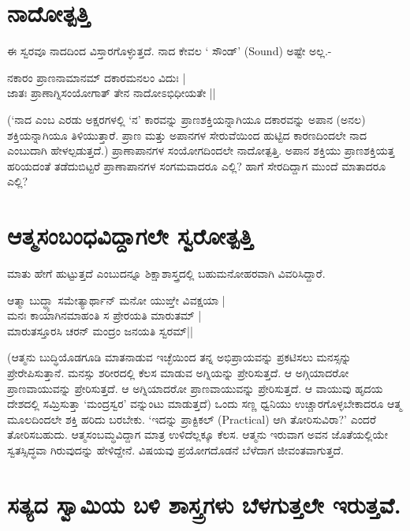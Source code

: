 \section*{ನಾದೋತ್ಪತ್ತಿ}

ಈ ಸ್ವರವೂ ನಾದದಿಂದ  ವಿಸ್ತಾರಗೊಳ್ಳುತ್ತದೆ. ನಾದ ಕೇವಲ ` ಸೌಂಡ್' {(\eng Sound)} ಅಷ್ಟೇ ಅಲ್ಲ.-

\begin{shloka}
ನಕಾರಂ ಪ್ರಾಣನಾಮಾನಮ್ ದಕಾರಮನಲಂ ವಿದುಃ |\label{17}\\
ಜಾತಃ ಪ್ರಾಣಾಗ್ನಿಸಂಯೋಗಾತ್ ತೇನ ನಾದೋಽಭಿಧೀಯತೇ ||
\end{shloka}

(`ನಾದ ಎಂಬ ಎರಡು ಅಕ್ಷರಗಳಲ್ಲಿ  `ನ' ಕಾರವನ್ನು  ಪ್ರಾಣಶಕ್ತಿಯನ್ನಾಗಿಯೂ ದಕಾರವನ್ನು ಅಪಾನ (ಅನಲ) ಶಕ್ತಿಯನ್ನಾಗಿಯೂ ತಿಳಿಯುತ್ತಾರೆ. ಪ್ರಾಣ ಮತ್ತು ಅಪಾನಗಳ ಸೇರುವೆಯಿಂದ ಹುಟ್ಟಿದ ಕಾರಣದಿಂದಲೇ ನಾದ ಎಂಬುದಾಗಿ ಹೇಳಲ್ಪಡುತ್ತದೆ.) ಪ್ರಾಣಾಪಾನಗಳ ಸಂಯೋಗದಿಂದಲೇ ನಾದೋತ್ಪತ್ತಿ. ಅಪಾನ ಶಕ್ತಿಯು ಪ್ರಾಣಶಕ್ತಿಯತ್ತ ಹರಿಯದಂತೆ ತಡೆದುಬಿಟ್ಟರೆ ಪ್ರಾಣಾಪಾನಗಳ ಸಂಗಮವಾದರೂ ಎಲ್ಲಿ? ಹಾಗೆ ಸೇರದಿದ್ದಾಗ ಮುಂದೆ ಮಾತಾದರೂ ಎಲ್ಲಿ?

\section*{ಆತ್ಮಸಂಬಂಧವಿದ್ದಾಗಲೇ ಸ್ವರೋತ್ಪತ್ತಿ}

ಮಾತು ಹೇಗೆ ಹುಟ್ಟುತ್ತದೆ ಎಂಬುದನ್ನೂ  ಶಿಕ್ಷಾಶಾಸ್ತ್ರದಲ್ಲಿ ಬಹುಮನೋಹರವಾಗಿ ವಿವರಿಸಿದ್ದಾರೆ.

\begin{shloka}
ಆತ್ಮಾ ಬುದ್ಧ್ಯಾ ಸಮೇತ್ಯಾರ್ಥಾನ್ ಮನೋ ಯುಙ್ತೇ ವಿವಕ್ಷಯಾ |\label{18}\\
ಮನಃ ಕಾಯಾಗಿನಮಾಹಂತಿ ಸ ಪ್ರೇರಯತಿ ಮಾರುತಮ್ |\\
ಮಾರುತಸ್ತೂರಸಿ ಚರನ್ ಮಂದ್ರಂ ಜನಯತಿ ಸ್ವರಮ್||
\end{shloka}

(ಆತ್ಮನು ಬುದ್ಧಿಯೊಡಗೂಡಿ ಮಾತನಾಡುವ ಇಚ್ಛೆಯಿಂದ ತನ್ನ ಅಭಿಪ್ರಾಯವನ್ನು ಪ್ರಕಟಿಸಲು ಮನಸ್ಸನ್ನು  ಪ್ರೇರೇಪಿಸುತ್ತಾನೆ. ಮನಸ್ಸು ಶರೀರದಲ್ಲಿ ಕೆಲಸ ಮಾಡುವ ಅಗ್ನಿಯನ್ನು ಪ್ರೇರಿಸುತ್ತದೆ.  ಆ ಅಗ್ಗಿಯಾದರೋ ಪ್ರಾಣವಾಯುವನ್ನು ಪ್ರೇರಿಸುತ್ತದೆ. ಆ ಅಗ್ನಿಯಾದರೋ ಪ್ರಾಣವಾಯುವನ್ನು ಪ್ರೇರಿಸುತ್ತದೆ. ಆ ವಾಯುವು ಹೃದಯ ದೇಶದಲ್ಲಿ ಸಮ್ರಿಸುತ್ತಾ `ಮಂದ್ರಸ್ವರ' ವನ್ನುಂಟು ಮಾಡುತ್ತದೆ) ಒಂದು ಸಣ್ಣ ಧ್ವನಿಯು ಉಚ್ಚಾರಗೊಳ್ಳಬೇಕಾದರೂ ಆತ್ಮ ಮೂಲದಿಂದಲೇ ಶಕ್ತಿ ಹರಿದು ಬರಬೇಕು. `ಇದನ್ನು ಪ್ರಾಕ್ಟಿಕಲ್ {(\eng Practical)} ಆಗಿ ತೋರಿಸುವಿರಾ?' ಎಂದರೆ ತೋರಿಸಬಹುದು. ಆತ್ಮಸಂಬಮ್ಧವಿದ್ದಾಗ ಮಾತ್ರ ಉಳಿದೆಲ್ಲಕ್ಕೂ ಕೆಲಸ. ಆತ್ಮನು ಇರುವಾಗ ಅವನ ಜೊತೆಯಲ್ಲಿಯೇ ಸ್ವತಸ್ಸಿದ್ಧವಾ ಗಿರುವುದನ್ನು  ಹೇಳಿದ್ದೇನೆ. ವಿಷಯವು ಪ್ರಯೋಗದೊಡನೆ ಬೆಳೆದಾಗ ಜೀವಂತವಾಗುತ್ತದೆ.

\section*{ಸತ್ಯದ ಸ್ವಾಮಿಯ ಬಳಿ ಶಾಸ್ತ್ರಗಳು ಬೆಳಗುತ್ತಲೇ ಇರುತ್ತವೆ.}

